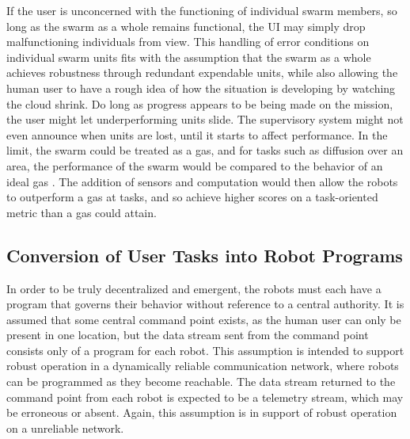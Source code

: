\documentclass[]{article}
\begin{document}
If the user is unconcerned with the functioning of individual swarm members, so long as the swarm as a whole remains functional, the UI may simply drop malfunctioning individuals from view. 
This handling of error conditions on individual swarm units fits with the assumption that the swarm as a whole achieves robustness through redundant expendable units, while also allowing the human user to have a rough idea of how the situation is developing by watching the cloud shrink. 
Do long as progress appears to be being made on the mission, the user might let underperforming units slide. 
The supervisory system might not even announce when units are lost, until it starts to affect performance.  
In the limit, the swarm could be treated as a gas, and for tasks such as diffusion over an area, the performance of the swarm would be compared to the behavior of an ideal gas \cite{jantz1997kinetics}.
The addition of sensors and computation would then allow the robots to outperform a gas at tasks, and so achieve higher scores on a task-oriented metric than a gas could attain. 
 

\subsection{Conversion of User Tasks into Robot Programs} 

In order to be truly decentralized and emergent, the robots must each have a program that governs their behavior without reference to a central authority. 
It is assumed that some central command point exists, as the human user can only be present in one location, but the data stream sent from the command point consists only of a program for each robot. 
This assumption is intended to support robust operation in a dynamically reliable communication network, where robots can be programmed as they become reachable. 
The data stream returned to the command point from each robot is expected to be a telemetry stream, which may be erroneous or absent. 
Again, this assumption is in support of robust operation on a unreliable network. 
\end{document}
